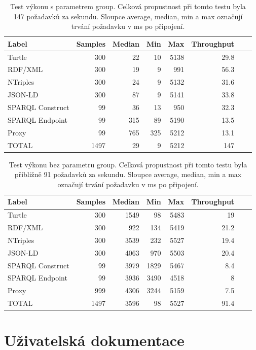 \documentclass[thesis=B,czech]{FITthesis}[2012/06/26]
\begin{document}
  \begin{table}\centering
 	\caption[Test výkonu - s parametrem group]{Test výkonu s parametrem group. Celková propustnost při tomto testu byla 147 požadavků za sekundu. Sloupce average, median, min a max označují trvání požadavku v ms po připojení.}\label{performance1}
 	\begin{tabular}{|l|r|r|r|r|r|r|r|}\hline
\textbf{Label}		& 	\textbf{Samples}&		\textbf{Median} &\textbf{Min} &	\textbf{Max} &		\textbf{Throughput} \tabularnewline \hline \hline
 Turtle			&	300	&			22&	10 &	5138&		29.8\tabularnewline \hline
 RDF/XML 		&	300	&			19&	9&	991	&	56.3\tabularnewline \hline
 NTriples 		&	300	&			24&	9&	5132 	&	31.6\tabularnewline \hline
 JSON-LD 		&	300	&			87&	9&	5141 	&	33.8\tabularnewline \hline
 SPARQL Construct 	&	99	&			36&	13&	950 	&	32.3\tabularnewline \hline
 SPARQL Endpoint 	&	99	&			315&	89&	5190 	&	13.5\tabularnewline \hline
 Proxy 			&	99	&			765&	325&	5212 	&	13.1\tabularnewline \hline
TOTAL			&	1497	&			29&	9&	5212 	&	147\tabularnewline \hline
 	\end{tabular}
 \end{table}
 
   \begin{table}\centering
 	\caption[Test výkonu - bez parametru group]{Test výkonu bez parametru group. Celková propustnost při tomto testu byla přibližně 91 požadavků za sekundu. Sloupce average, median, min a max označují trvání požadavku v ms po připojení.}\label{performance2}
 	\begin{tabular}{|l|r|r|r|r|r|r|r|}\hline
\textbf{Label}			& 	\textbf{Samples}&		\textbf{Median} &\textbf{Min} &	\textbf{Max} &		\textbf{Throughput} \tabularnewline \hline \hline
 Turtle				&300		&1549	&98	&5483	&19\tabularnewline \hline
 RDF/XML 			&300		&922	&134	&5419	&21.2\tabularnewline \hline
 NTriples 			&300		&3539	&232	&5527	&19.4\tabularnewline \hline
 JSON-LD 			&300		&4063	&970	&5503	&20.4\tabularnewline \hline
 SPARQL Construct 		&99		&3979	&1829	&5467	&8.4\tabularnewline \hline
 SPARQL Endpoint 		&99		&3936	&3490	&4518	&8\tabularnewline \hline
 Proxy 				&999		&4306	&3244	&5159	&7.5\tabularnewline \hline
TOTAL				&1497		&3596	&98	&5527	&91.4\tabularnewline \hline
 	\end{tabular}
 \end{table}
  
  
  \chapter{Uživatelská dokumentace}
  
\end{document}
